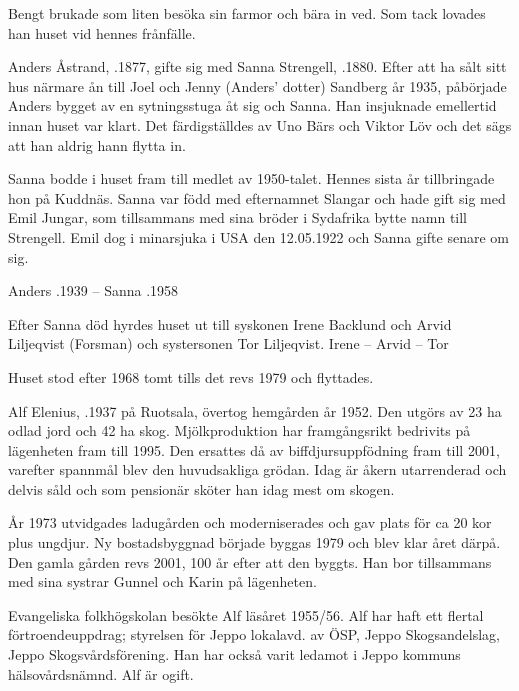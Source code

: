 Bengt brukade som liten besöka sin farmor och bära in ved. Som tack lovades han huset vid hennes frånfälle.


Anders Åstrand, .1877, gifte sig med Sanna Strengell, .1880.  Efter att ha sålt sitt hus närmare ån till Joel och Jenny (Anders' dotter) Sandberg år 1935, påbörjade Anders bygget av en sytningsstuga åt sig och Sanna. Han insjuknade emellertid innan huset var klart. Det färdigställdes av Uno Bärs och Viktor Löv och det sägs att han aldrig hann flytta in.

Sanna bodde i huset fram till medlet av 1950-talet. Hennes sista år tillbringade hon på Kuddnäs. Sanna var född med efternamnet Slangar och hade gift sig med Emil Jungar, som tillsammans med sina bröder i Sydafrika bytte namn till Strengell. Emil dog i minarsjuka i USA den 12.05.1922 och Sanna gifte senare om sig.

Anders .1939  --  Sanna .1958

Efter Sanna död hyrdes huset ut till syskonen Irene Backlund och Arvid Liljeqvist (Forsman) och systersonen Tor Liljeqvist. Irene	  --  Arvid   --  Tor	

Huset stod efter 1968 tomt tills det revs 1979 och flyttades.




Alf Elenius, .1937 på Ruotsala, övertog hemgården år 1952. Den utgörs av 23 ha odlad jord och 42 ha skog. Mjölkproduktion har framgångsrikt bedrivits på lägenheten fram till 1995. Den ersattes då av biffdjursuppfödning fram till 2001, varefter spannmål blev den huvudsakliga grödan. Idag är åkern utarrenderad och delvis såld och som pensionär  sköter han idag mest om skogen.

År 1973 utvidgades ladugården och moderniserades och gav plats för ca 20 kor plus ungdjur. Ny bostadsbyggnad började byggas 1979 och blev klar året därpå. Den gamla gården revs 2001, 100 år efter att den byggts. Han bor tillsammans med sina systrar Gunnel och Karin på lägenheten.

Evangeliska folkhögskolan besökte Alf läsåret 1955/56. Alf har haft ett flertal förtroendeuppdrag; styrelsen för Jeppo lokalavd. av ÖSP, Jeppo Skogsandelslag, Jeppo Skogsvårdsförening. Han har också varit ledamot i Jeppo kommuns hälsovårdsnämnd. Alf är ogift.



